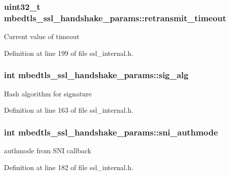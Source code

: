\hypertarget{structmbedtls__ssl__handshake__params_a915ed07c7ce86c7cc3e10a0eab2547f0}{
\subsubsection[{retransmit\-\_\-timeout}]{\setlength{\rightskip}{0pt plus 5cm}uint32\-\_\-t mbedtls\-\_\-ssl\-\_\-handshake\-\_\-params\-::retransmit\-\_\-timeout}}\label{structmbedtls__ssl__handshake__params_a915ed07c7ce86c7cc3e10a0eab2547f0}
Current value of timeout 

Definition at line 199 of file ssl\-\_\-internal.\-h.

\hypertarget{structmbedtls__ssl__handshake__params_a5bd51cd234637157e288f1e5779701c5}{
\subsubsection[{sig\-\_\-alg}]{\setlength{\rightskip}{0pt plus 5cm}int mbedtls\-\_\-ssl\-\_\-handshake\-\_\-params\-::sig\-\_\-alg}}\label{structmbedtls__ssl__handshake__params_a5bd51cd234637157e288f1e5779701c5}
Hash algorithm for signature 

Definition at line 163 of file ssl\-\_\-internal.\-h.

\hypertarget{structmbedtls__ssl__handshake__params_ada4c8d021bb297b6728d6f117a026fd0}{
\subsubsection[{sni\-\_\-authmode}]{\setlength{\rightskip}{0pt plus 5cm}int mbedtls\-\_\-ssl\-\_\-handshake\-\_\-params\-::sni\-\_\-authmode}}\label{structmbedtls__ssl__handshake__params_ada4c8d021bb297b6728d6f117a026fd0}
authmode from S\-N\-I callback 

Definition at line 182 of file ssl\-\_\-internal.\-h.

